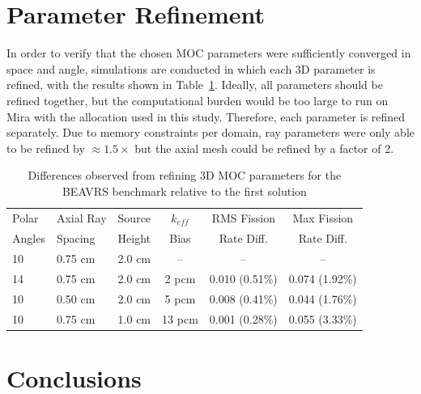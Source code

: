 \newpage
\section{Parameter Refinement}
\label{sec:fc-parameter-refinement}

In order to verify that the chosen \ac{MOC} parameters were sufficiently converged in space and angle, simulations are conducted in which each 3D parameter is refined, with the results shown in Table~\ref{tab:fc-param-sensitivity}. Ideally, all parameters should be refined together, but the computational burden would be too large to run on Mira with the allocation used in this study. Therefore, each parameter is refined separately. Due to memory constraints per domain, ray parameters were only able to be refined by $\approx 1.5 \times$ but the axial mesh could be refined by a factor of 2. 


\begin{table}[ht]
	\centering
	\caption{Differences observed from refining 3D MOC parameters for the BEAVRS benchmark relative to the first solution}
	\medskip
	\begin{tabular}{l|l|l|c|c|c}
		\hline
		Polar  & Axial Ray & Source & $k_{\textit{eff}}$  & \ac{RMS} Fission & Max Fission \\
		Angles & Spacing   & Height & Bias                & Rate Diff. & Rate Diff. \\
		\hline
		10 & 0.75 cm & 2.0 cm & --     & --     & --  \\
		14 & 0.75 cm & 2.0 cm & 2 pcm  & 0.010 (0.51\%) & 0.074 (1.92\%)  \\
		10 & 0.50 cm & 2.0 cm & 5 pcm  & 0.008 (0.41\%) & 0.044 (1.76\%) \\
		10 & 0.75 cm & 1.0 cm & 13 pcm & 0.001 (0.28\%) & 0.055 (3.33\%)  \\
		\hline
	\end{tabular}
	\label{tab:fc-param-sensitivity}
\end{table}

\section{Conclusions}
\label{sec:fc-conclusion}

